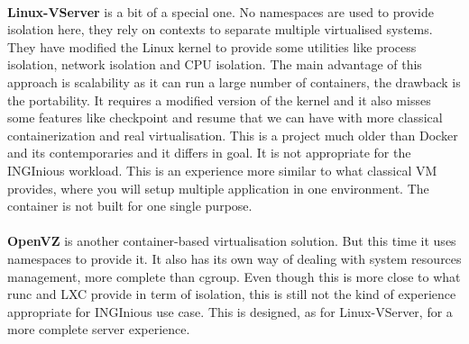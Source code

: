 \paragraph{}\textbf{Linux-VServer}\cite{linux-vserver} is a bit of a special one.  No namespaces are used to provide isolation here, they rely on contexts to separate multiple virtualised systems.  They have modified the Linux kernel to provide some utilities like process isolation, network isolation and CPU isolation.  The main advantage of this approach is scalability as it can run a large number of containers, the drawback is the portability.  It requires a modified version of the kernel and it also misses some features like checkpoint and resume that we can have with more classical containerization and real virtualisation.  This is a project much older than Docker and its contemporaries and it differs in goal.  It is not appropriate for the INGInious workload.  This is an experience more similar to what classical VM provides, where you will setup multiple application in one environment.  The container is not built for one single purpose.

\paragraph{}\textbf{OpenVZ}\cite{openvz} is another container-based virtualisation solution.  But this time it uses namespaces to provide it.  It also has its own way of dealing with system resources management, more complete than cgroup.  Even though this is more close to what runc and LXC provide in term of isolation, this is still not the kind of experience appropriate for INGInious use case.  This is designed, as for Linux-VServer, for a more complete server experience.

